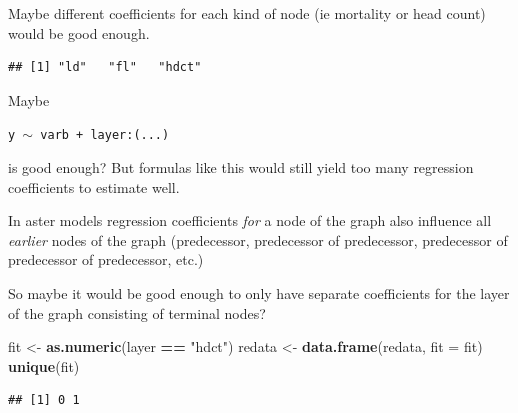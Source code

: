 \documentclass[
  ignorenonframetext,
]{beamer}
\newenvironment{Shaded}{\begin{snugshade}}{\end{snugshade}}
\newcommand{\AttributeTok}[1]{\textcolor[rgb]{0.13,0.29,0.53}{#1}}
\newcommand{\FunctionTok}[1]{\textcolor[rgb]{0.13,0.29,0.53}{\textbf{#1}}}
\newcommand{\NormalTok}[1]{#1}
\newcommand{\OtherTok}[1]{\textcolor[rgb]{0.56,0.35,0.01}{#1}}
\newcommand{\SpecialCharTok}[1]{\textcolor[rgb]{0.81,0.36,0.00}{\textbf{#1}}}
\newcommand{\StringTok}[1]{\textcolor[rgb]{0.31,0.60,0.02}{#1}}
\begin{document}
\begin{frame}[fragile]{}
\protect\hypertarget{section-16}{}
Maybe different coefficients for each kind of node (ie mortality or head
count) would be good enough.

\vspace{12pt}
\tiny

\begin{Shaded}
\end{Shaded}

\begin{verbatim}
## [1] "ld"   "fl"   "hdct"
\end{verbatim}

\vspace{12pt}
\normalsize

Maybe

\begin{center}
  \texttt{y $\sim$ varb + layer:(...)}
\end{center}

is good enough? But formulas like this would still yield too many
regression coefficients to estimate well.
\end{frame}

\begin{frame}[fragile]{}
\protect\hypertarget{section-17}{}
In aster models regression coefficients \emph{for} a node of the graph
also influence all \emph{earlier} nodes of the graph (predecessor,
predecessor of predecessor, predecessor of predecessor of predecessor,
etc.)

So maybe it would be good enough to only have separate coefficients for
the layer of the graph consisting of terminal nodes?

\vspace{12pt}

\begin{Shaded}
\begin{Highlighting}[]
\NormalTok{fit }\OtherTok{\textless{}{-}} \FunctionTok{as.numeric}\NormalTok{(layer }\SpecialCharTok{==} \StringTok{"hdct"}\NormalTok{) }
\NormalTok{redata }\OtherTok{\textless{}{-}} \FunctionTok{data.frame}\NormalTok{(redata, }\AttributeTok{fit =}\NormalTok{ fit)}
\FunctionTok{unique}\NormalTok{(fit)}
\end{Highlighting}
\end{Shaded}

\begin{verbatim}
## [1] 0 1
\end{verbatim}
\end{frame}
\end{document}
